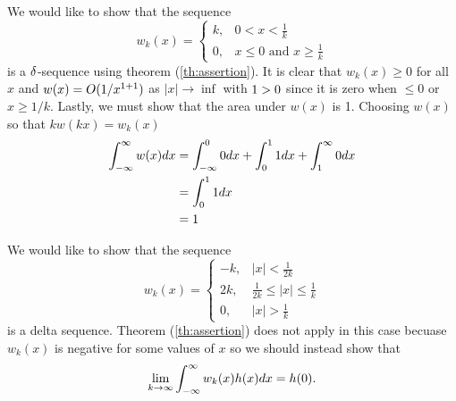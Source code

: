 \begin{example}
    We would like to show that the sequence
    \begin{equation*}
        w_k(x) = \begin{cases}
            k, &  0<x<\frac{1}{k}\\
            0, &x\leq 0 \text{ and } x \geq \frac{1}{k}
        \end{cases}
    \end{equation*}
    is a \(\delta\)-sequence using theorem (\ref{th:assertion}). It is clear that \(w_k(x)\geq 0\)  for all \(x\) and \(w(x)=O(1/x^{1+1})\) as \(|x| \rightarrow \inf\) with \(1>0\) since it is zero when \(\leq 0\) or \(x \geq 1/k\). Lastly, we must show that the area under \(w(x)\) is 1. Choosing \(w(x)\) so that \(kw(kx)=w_k(x)\)
    \begin{equation}
        \begin{split}
            \int_{-\infty}^{\infty} w(x) dx &= \int_{-\infty}^{0} 0 dx +\int_0^1 1 dx + \int_{1}^{\infty} 0 dx\\
            &=\int_0^1 1 dx\\
            &=1
        \end{split}
    \end{equation}
\end{example}

\begin{example}
    We would like to show that the sequence
    \begin{equation}
        w_k(x) = \begin{cases}
            -k, &|x|<\frac{1}{2k}\\
            2k, &\frac{1}{2k} \leq |x| \leq \frac{1}{k}\\
            0, &|x|> \frac{1}{k} 
        \end{cases}
    \end{equation}
    is a delta sequence. Theorem (\ref{th:assertion}) does not apply in this case becuase \(w_k(x)\) is negative for some values of \(x\) so we should instead show that 
    \begin{equation}
        \lim_{k\to \infty}\int_{-\infty}^{\infty} w_k(x) h(x) dx = h(0).
    \end{equation}
    
\end{example}